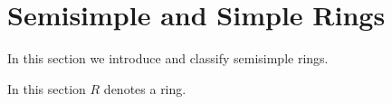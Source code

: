 \section{Semisimple and Simple Rings}


\begin{fluff}
  In this section we introduce and classify semisimple rings.
\end{fluff}


\begin{conventions}
  In this section $R$ denotes a ring.
\end{conventions}











